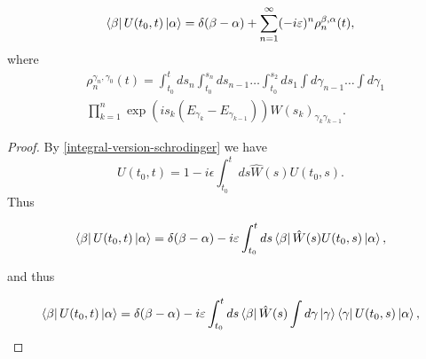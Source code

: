 \documentclass[main.tex]{subfiles}
\begin{document}
\begin{lemma}
\label{perturbation-aproximations}
\begin{equation}
\bra{\beta} U(t_0, t) \ket{\alpha} = \delta(\beta - \alpha) + \sum_{n=1}^\infty (-i\varepsilon)^n \rho^{\beta,\alpha}_n(t),
\end{equation}
where
\begin{align*}
& \rho^{\gamma_n, \gamma_0}_n(t) = \int_{t_0}^t ds_n \int_{t_0}^{s_n} ds_{n - 1}\dots \int_{t_0}^{s_2} ds_1 \int d\gamma_{n-1} \dots \int d\gamma_1 \\
& \prod_{k=1}^n \exp(is_k(E_{\gamma_k} - E_{\gamma_{k - 1}})) W(s_k)_{\gamma_k \gamma_{k - 1}}.
\end{align*}
\end{lemma}
\begin{proof}
By \ref{integral-version-schrodinger} we have
\begin{equation}
U(t_0, t) = 1 - i\epsilon \int_{t_0}^t ds \hat{W}(s) U(t_0, s).
\end{equation}
Thus

\begin{equation}
\bra{\beta} U(t_0, t) \ket{\alpha} = \delta(\beta - \alpha) - i\varepsilon\int_{t_0}^t ds \bra{\beta}\hat{W}(s) U(t_0, s)\ket{\alpha},
\end{equation}

and thus

\begin{equation}
\bra{\beta} U(t_0, t) \ket{\alpha} = \delta(\beta - \alpha) - i\varepsilon\int_{t_0}^t ds \bra{\beta}\hat{W}(s)\int d\gamma \ket{\gamma}\bra{\gamma} U(t_0, s)\ket{\alpha},
\end{equation}


\end{proof}
\end{document}

